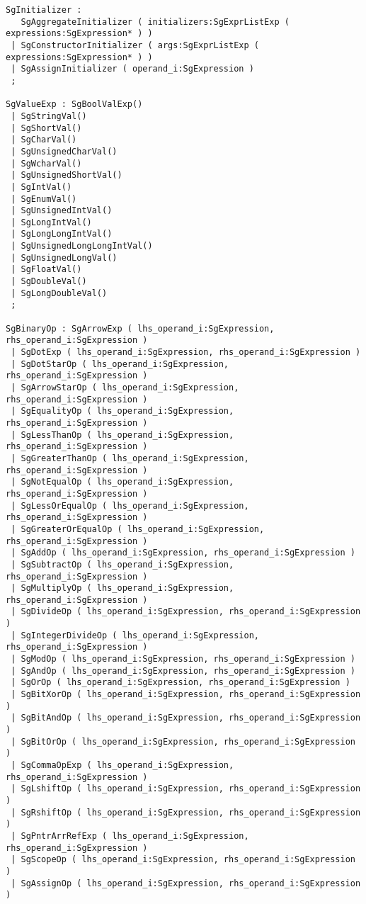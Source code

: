 \begin{verbatim}
SgInitializer : 
   SgAggregateInitializer ( initializers:SgExprListExp ( expressions:SgExpression* ) )
 | SgConstructorInitializer ( args:SgExprListExp ( expressions:SgExpression* ) )
 | SgAssignInitializer ( operand_i:SgExpression )
 ;

SgValueExp : SgBoolValExp()
 | SgStringVal()
 | SgShortVal()
 | SgCharVal()
 | SgUnsignedCharVal()
 | SgWcharVal()
 | SgUnsignedShortVal()
 | SgIntVal()
 | SgEnumVal()
 | SgUnsignedIntVal()
 | SgLongIntVal()
 | SgLongLongIntVal()
 | SgUnsignedLongLongIntVal()
 | SgUnsignedLongVal()
 | SgFloatVal()
 | SgDoubleVal()
 | SgLongDoubleVal()
 ;

SgBinaryOp : SgArrowExp ( lhs_operand_i:SgExpression, rhs_operand_i:SgExpression )
 | SgDotExp ( lhs_operand_i:SgExpression, rhs_operand_i:SgExpression )
 | SgDotStarOp ( lhs_operand_i:SgExpression, rhs_operand_i:SgExpression )
 | SgArrowStarOp ( lhs_operand_i:SgExpression, rhs_operand_i:SgExpression )
 | SgEqualityOp ( lhs_operand_i:SgExpression, rhs_operand_i:SgExpression )
 | SgLessThanOp ( lhs_operand_i:SgExpression, rhs_operand_i:SgExpression )
 | SgGreaterThanOp ( lhs_operand_i:SgExpression, rhs_operand_i:SgExpression )
 | SgNotEqualOp ( lhs_operand_i:SgExpression, rhs_operand_i:SgExpression )
 | SgLessOrEqualOp ( lhs_operand_i:SgExpression, rhs_operand_i:SgExpression )
 | SgGreaterOrEqualOp ( lhs_operand_i:SgExpression, rhs_operand_i:SgExpression )
 | SgAddOp ( lhs_operand_i:SgExpression, rhs_operand_i:SgExpression )
 | SgSubtractOp ( lhs_operand_i:SgExpression, rhs_operand_i:SgExpression )
 | SgMultiplyOp ( lhs_operand_i:SgExpression, rhs_operand_i:SgExpression )
 | SgDivideOp ( lhs_operand_i:SgExpression, rhs_operand_i:SgExpression )
 | SgIntegerDivideOp ( lhs_operand_i:SgExpression, rhs_operand_i:SgExpression )
 | SgModOp ( lhs_operand_i:SgExpression, rhs_operand_i:SgExpression )
 | SgAndOp ( lhs_operand_i:SgExpression, rhs_operand_i:SgExpression )
 | SgOrOp ( lhs_operand_i:SgExpression, rhs_operand_i:SgExpression )
 | SgBitXorOp ( lhs_operand_i:SgExpression, rhs_operand_i:SgExpression )
 | SgBitAndOp ( lhs_operand_i:SgExpression, rhs_operand_i:SgExpression )
 | SgBitOrOp ( lhs_operand_i:SgExpression, rhs_operand_i:SgExpression )
 | SgCommaOpExp ( lhs_operand_i:SgExpression, rhs_operand_i:SgExpression )
 | SgLshiftOp ( lhs_operand_i:SgExpression, rhs_operand_i:SgExpression )
 | SgRshiftOp ( lhs_operand_i:SgExpression, rhs_operand_i:SgExpression )
 | SgPntrArrRefExp ( lhs_operand_i:SgExpression, rhs_operand_i:SgExpression )
 | SgScopeOp ( lhs_operand_i:SgExpression, rhs_operand_i:SgExpression )
 | SgAssignOp ( lhs_operand_i:SgExpression, rhs_operand_i:SgExpression )

\end{verbatim}
